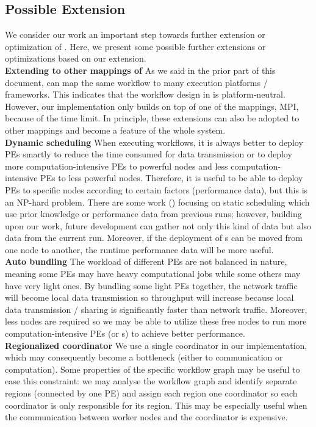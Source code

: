 \subsection{Possible Extension}
We consider our work an important step towards further extension or optimization of \dpy. Here, we present some possible further extensions or optimizations based on our extension. \\

\textbf{Extending to other mappings of \dpy}\quad
As we said in the prior part of this document, \dpy can map the same workflow to many execution platforms / frameworks. This indicates that the workflow design in \dpy is platform-neutral. However, our implementation only builds on top of one of the mappings, MPI, because of the time limit. In principle, these extensions can also be adopted to other mappings and become a feature of the whole \dpy system. \\

\textbf{Dynamic scheduling}\quad
When executing workflows, it is always better to deploy PEs smartly to reduce the time consumed for data transmission or to deploy more computation-intensive PEs to powerful nodes and less computation-intensive PEs to less powerful nodes. Therefore, it is useful to be able to deploy PEs to specific nodes according to certain factors (\eg performance data), but this is an NP-hard problem. There are some work (\eg \cite{teylo2017hybrid}) focusing on static scheduling which use prior knowledge or performance data from previous runs; however, building upon our work, future development can gather not only this kind of data but also data from the current run. Moreover, if the deployment of \tPEInst{}s can be moved from one node to another, the runtime performance data will be more useful. \\

\textbf{Auto bundling}\quad
The workload of different PEs are not balanced in nature, meaning some PEs may have heavy computational jobs while some others may have very light ones. By bundling some light PEs together, the network traffic will become local data transmission so throughput will increase because local data transmission / sharing is significantly faster than network traffic. Moreover, less nodes are required so we may be able to utilize these free nodes to run more computation-intensive PEs (or \tPEDup{}s) to achieve better performance. \\

\textbf{Regionalized coordinator}\quad
We use a single coordinator in our implementation, which may consequently become a bottleneck (either to communication or computation). Some properties of the specific workflow graph may be useful to ease this constraint: we may analyse the workflow graph and identify separate regions (\eg connected by one PE) and assign each region one coordinator so each coordinator is only responsible for its region. This may be especially useful when the communication between worker nodes and the coordinator is expensive. \\

